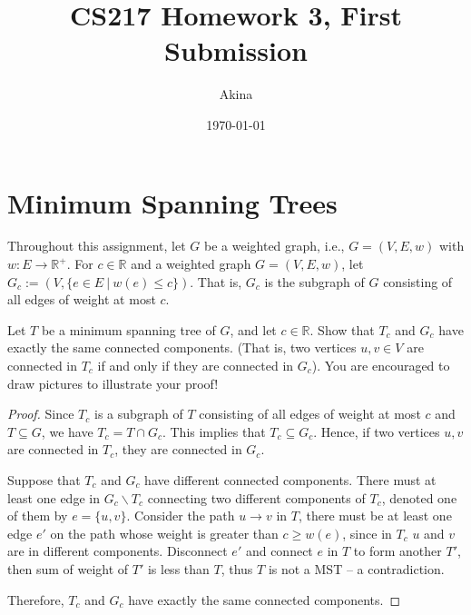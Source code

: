 \documentclass[11pt,a4paper,oneside]{article}
\newcommand{\R}{\mathbb{R}}
\renewcommand{\hwtitle} {CS217 Homework 3, First Submission}
\renewcommand{\hwauthor}{Akina}
\renewcommand{\hwdate}{\today}
\begin{document}
\title{\hwtitle}
\author{\hwauthor}
\date{\hwdate}
\maketitle

\section*{Minimum Spanning Trees}

Throughout this assignment, let $G$ be a weighted graph, i.e., $G=(V,E,w)$ 
with $w: E \rightarrow \R^+$.
For $c \in \R$ and a weighted graph $G = (V,E,w)$, let
$G_c := (V, \{e \in E \ | \ w(e) \leq c\})$. That is, $G_c$ is the
subgraph of $G$ consisting of all edges of weight at most $c$.

\begin{problem}{1}
	\statement
	Let $T$ be a minimum spanning tree of $G$, and let $c \in \R$.  Show that
	$T_c$ and $G_c$ have exactly the same connected components.  (That
	is, two vertices $u,v \in V$ are connected in $T_c$ if and only if
	they are connected in $G_c$).
	You are encouraged to draw pictures to illustrate your proof!
	\solution
	
	\begin{proof}
		Since \(T_c\) is a subgraph of \(T\) consisting of all edges of weight at most \(c\) and \(T \subseteq G\), we have  \(T_c = T \cap G_c\). This implies that \(T_c \subseteq G_c\). Hence, if two vertices \(u, v\) are connected in \(T_c\), they are connected in \(G_c\). 
		
		Suppose that \(T_c\) and \(G_c\) have different connected components. There must at least one edge in $G_c \backslash T_c$ connecting two different components of \(T_c\), denoted one of them by \(e = \{u, v\}\). Consider the path $u \rightarrow v$ in $T$, there must be at least one edge $e'$ on the path whose weight is greater than $c \geq w(e)$, since in $T_c$ $u$ and $v$ are in different components. Disconnect \(e'\) and connect \(e\) in $T$ to form another $T'$, then sum of weight of $T'$ is less than $T$, thus $T$ is not a MST -- a contradiction.
		
		Therefore, \(T_c\) and \(G_c\) have exactly the same connected components.
	\end{proof}
\end{problem}
\end{document}
